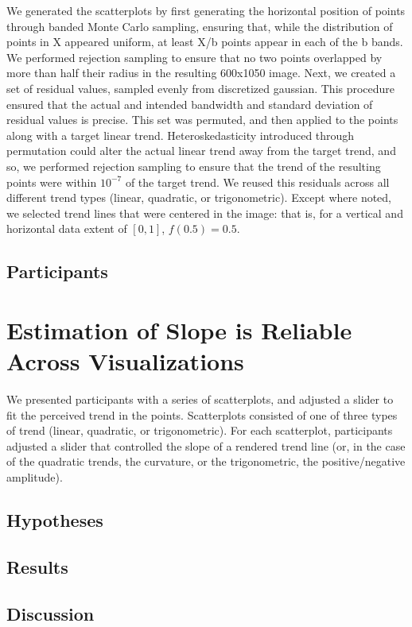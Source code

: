 \documentclass{sigchi}
\begin{document}
We generated the scatterplots by first generating the horizontal position of points through banded Monte Carlo sampling, ensuring that, while the distribution of points in X appeared uniform, at least X/b points appear in each of the b bands. We performed rejection sampling to ensure that no two points overlapped by more than half their radius in the resulting 600x1050 image. Next, we created a set of residual values, sampled evenly from discretized gaussian. This procedure ensured that the actual and intended bandwidth and standard deviation of residual values is precise. This set was permuted, and then applied to the points along with a target linear trend. Heteroskedasticity introduced through permutation could alter the actual linear trend away from the target trend, and so, we performed rejection sampling to ensure that the trend of the resulting points were within $10^{-7}$ of the target trend. We reused this residuals across all different trend types (linear, quadratic, or trigonometric). Except where noted, we selected trend lines that were centered in the image: that is, for a vertical and horizontal data extent of $[0,1]$, $f(0.5) = 0.5$.

\subsection{Participants}


\section{Estimation of Slope is Reliable \\ Across Visualizations}

We presented participants with a series of scatterplots, and adjusted a slider to fit the perceived trend in the points. Scatterplots consisted of one of three types of trend (linear, quadratic, or trigonometric). For each scatterplot, participants adjusted a slider that controlled the slope of a rendered trend line (or, in the case of the quadratic trends, the curvature, or the trigonometric, the positive/negative amplitude).


\subsection{Hypotheses}
\subsection{Results}
\subsection{Discussion}
\end{document}
